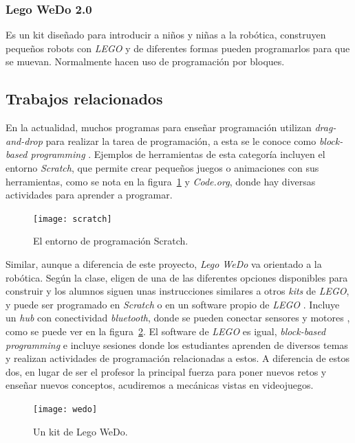 \subsubsection{Lego WeDo 2.0}
Es un kit diseñado para introducir a niños y niñas a la robótica, 
construyen pequeños robots con \textit{LEGO} y de diferentes 
formas pueden programarlos para que se muevan. 
Normalmente hacen uso de programación por bloques.

\subsection{Trabajos relacionados}
En la actualidad, muchos programas para enseñar programación utilizan 
\textit{drag-and-drop} para realizar la tarea de programación, 
a esta se le conoce como \textit{block-based programming} \cite{block_based_programming}. 
Ejemplos de herramientas de esta categoría incluyen el entorno \textit{Scratch}, 
que permite crear pequeños juegos o animaciones con sus herramientas, 
como se nota en la figura~\ref{fig:scratch_scrn} y \textit{Code.org}, donde hay diversas actividades 
para aprender a programar.

\begin{figure}[ht]
    \centering
    \texttt{[image: scratch]}
    \caption{El entorno de programación Scratch.}
    \label{fig:scratch_scrn}
\end{figure}

Similar, aunque a diferencia de este proyecto, \textit{Lego WeDo} va orientado a la robótica. Según la clase, eligen de una de las diferentes opciones disponibles para construir y los alumnos siguen unas instrucciones similares a otros \textit{kits} de \textit{LEGO}, y puede ser programado en \textit{Scratch} o en un software propio de \textit{LEGO} \cite{lego_wedo_explanation}. Incluye un \textit{hub} con conectividad \textit{bluetooth}, donde se pueden conectar sensores y motores \cite{lego_wedo_site}, como se puede ver en la figura~\ref{fig:wedo_kit}. El software de \textit{LEGO} es igual, \textit{block-based programming} e incluye sesiones donde los estudiantes aprenden de diversos temas y realizan actividades de programación relacionadas a estos. A diferencia de estos dos, en lugar de ser el profesor la principal fuerza para poner nuevos retos y enseñar nuevos conceptos, acudiremos a mecánicas vistas en videojuegos.

\begin{figure}[ht]
    \centering
    \texttt{[image: wedo]}
    \caption{Un kit de Lego WeDo.}
    \label{fig:wedo_kit}
\end{figure}

